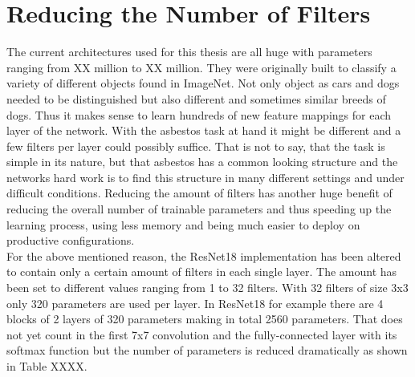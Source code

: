 \section{Reducing the Number of Filters}

The current architectures used for this thesis are all huge with parameters ranging from XX million to XX million. They were originally built to classify a variety of different objects found in ImageNet. Not only object as cars and dogs needed to be distinguished but also different and sometimes similar breeds of dogs. Thus it makes sense to learn hundreds of new feature mappings for each layer of the network. With the asbestos task at hand it might be different and a few filters per layer could possibly suffice. That is not to say, that the task is simple in its nature, but that asbestos has a common looking structure and the networks hard work is to find this structure in many different settings and under difficult conditions. Reducing the amount of filters has another huge benefit of reducing the overall number of trainable parameters and thus speeding up the learning process, using less memory and being much easier to deploy on productive configurations.\\

For the above mentioned reason, the ResNet18 implementation has been altered to contain only a certain amount of filters in each single layer. The amount has been set to different values ranging from 1 to 32 filters. With 32 filters of size 3x3 only 320 parameters are used per layer. In ResNet18 for example there are 4 blocks of 2 layers of 320 parameters making in total 2560 parameters. That does not yet count in the first 7x7 convolution and the fully-connected layer with its softmax function but the number of parameters is reduced dramatically as shown in Table XXXX.


\begin{table}[h] \centering
{}
\caption{Resnet18 with different number of filters on the FINAL dataset. The number of filters present in paranthesis is the number of filters used per layer.}
\label{tbl:resnet18-sixteen}
\end{table}

